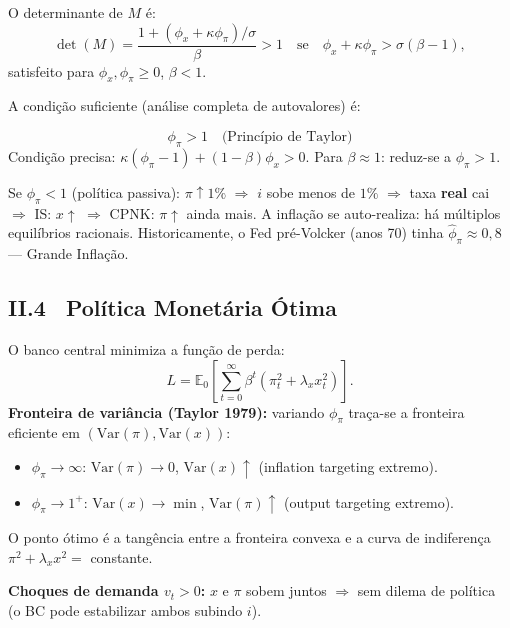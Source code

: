\documentclass[12pt, a4paper]{article}
\newcommand{\E}{\mathbb{E}}
\begin{document}
O determinante de $M$ é:
\[
\det(M) = \frac{1 + (\phi_x + \kappa\phi_\pi)/\sigma}{\beta} > 1
\quad\text{se}\quad \phi_x + \kappa\phi_\pi > \sigma(\beta-1),
\]
satisfeito para $\phi_x,\phi_\pi\geq 0$, $\beta<1$.

A condição suficiente (análise completa de autovalores) é:

\begin{resultbox}[title={Princípio de Taylor e condição de determinação}]
\[
\phi_\pi > 1 \quad\text{(Princípio de Taylor)}
\]
Condição precisa: $\kappa(\phi_\pi-1) + (1-\beta)\phi_x > 0$.
Para $\beta\approx 1$: reduz-se a $\phi_\pi > 1$.
\end{resultbox}

\begin{provabox}[title={Por que $\phi_\pi < 1$ leva à indeterminação}]
Se $\phi_\pi < 1$ (política passiva): $\pi\uparrow 1\%$ $\Rightarrow$ $i$ sobe
menos de $1\%$ $\Rightarrow$ taxa \textbf{real} cai $\Rightarrow$ IS: $x\uparrow$
$\Rightarrow$ CPNK: $\pi\uparrow$ ainda mais. A inflação se auto-realiza:
há múltiplos equilíbrios racionais. Historicamente, o Fed pré-Volcker (anos 70)
tinha $\hat{\phi}_\pi \approx 0{,}8$ --- Grande Inflação.
\end{provabox}

\subsection*{II.4 \ Política Monetária Ótima}

O banco central minimiza a função de perda:
\[
L = \E_0\!\left[\sum_{t=0}^\infty\beta^t(\pi_t^2 + \lambda_x x_t^2)\right].
\]
\textbf{Fronteira de variância (Taylor 1979):}
variando $\phi_\pi$ traça-se a fronteira eficiente em $(\text{Var}(\pi), \text{Var}(x))$:
\begin{itemize}[leftmargin=1.5em, itemsep=2pt]
  \item $\phi_\pi\to\infty$: $\text{Var}(\pi)\to 0$, $\text{Var}(x)\uparrow$
        (inflation targeting extremo).
  \item $\phi_\pi\to 1^+$: $\text{Var}(x)\to\min$, $\text{Var}(\pi)\uparrow$
        (output targeting extremo).
\end{itemize}
O ponto ótimo é a tangência entre a fronteira convexa e a curva de indiferença
$\pi^2 + \lambda_x x^2 = $ constante.

\textbf{Choques de demanda $v_t>0$:} $x$ e $\pi$ sobem juntos $\Rightarrow$ sem
dilema de política (o BC pode estabilizar ambos subindo $i$).
\end{document}
